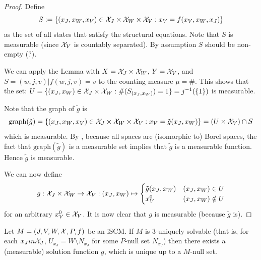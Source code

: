 \begin{proof}
Define
  $$S := \{ (x_J,x_W,x_V) \in \mathcal{X}_J \times \mathcal{X}_W \times \mathcal{X}_V : x_V = f(x_V,x_W,x_J) \}$$
as the set of all states that satisfy the structural equations.
Note that $S$ is measurable (since $\mathcal{X}_V$ is countably separated). 
By assumption $S$ should be non-empty (?).

We can apply the Lemma with $X = \mathcal{X}_J \times \mathcal{X}_W$, $Y = \mathcal{X}_V$, and $S = { (w,j,v) | f(w,j,v) = v }$ to the counting measure $\mu = \#$.
This shows that the set:
  $U = \{ (x_J,x_W) \in \mathcal{X}_J \times \mathcal{X}_W : \#(S_{(x_J,x_W)}) = 1 \} = j^{-1}(\{1\})$
is measurable.

Note that the graph of $\tilde{g}$ is
  $$\mathrm{graph}(\tilde{g}) = \{(x_{J},x_{W},x_{V}) \in \mathcal{X}_{J} \times \mathcal{X}_{W} \times \mathcal{X}_{V} : x_{V} = \tilde{g}(x_{J},x_{W})\} = (U \times \mathcal{X}_V) \cap S$$
which is measurable.
By \cite[14.12]{Kec95}, because all spaces are (isomorphic to) Borel spaces, the fact that $\mathrm{graph}(\tilde{g})$ is a measurable set implies that $\tilde{g}$ is a measurable function. 
Hence $\tilde{g}$ is measurable.

We can now define
  $$g : \mathcal{X}_J \times \mathcal{X}_W \to \mathcal{X}_V : (x_J,x_W) \mapsto \begin{cases} \tilde{g}(x_J,x_W) & (x_J,x_W) \in U \\
                                                                               x_V^0      & (x_J,x_W) \notin U
  \end{cases}$$
for an arbitrary $x_V^0 \in \mathcal{X}_V$.
It is now clear that $g$ is measurable (because $\tilde{g}$ is).
%
\end{proof}
\begin{Cor}
  Let $M = \left ( J, V, W, \mathcal{X}, P, f \right )$ be an iSCM.
  If $M$ is 3-uniquely solvable (that is, for each $x_J in \mathcal{X}_J$, $U_{x_J} = W \setminus N_{x_J}$ for some $P$-null set $N_{x_J}$) then there exists a (measurable) solution function $g$, which is unique up to a $M$-null set.
\end{Cor}


